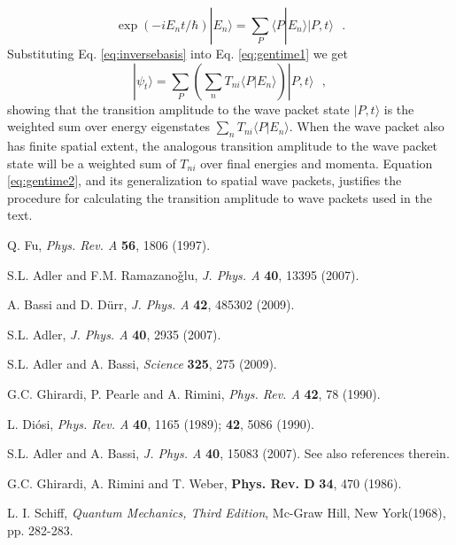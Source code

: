 \documentclass[12pt,onecolumn,amssymb,nofootinbib]{revtex4-2} %
\begin{document}
\begin{equation}\label{eq:inversebasis}
 \exp{(-i E_n t/\hbar)}|E_n \rangle=\sum_P   \langle P| E_n\rangle |P,t\rangle ~~~.
\end{equation}
Substituting Eq. \eqref{eq:inversebasis} into Eq. \eqref{eq:gentime1} we get
\begin{equation}\label{eq:gentime2}
|\psi_t\rangle = \sum_P \left(\sum_n T_{ni} \langle P| E_n\rangle \right)|P,t\rangle ~~~,
\end{equation}
showing that the transition amplitude to the wave packet state $|P,t\rangle $
is the weighted sum over energy eigenstates $\sum_n T_{ni} \langle P| E_n\rangle $.
When the wave packet also has finite spatial extent, the analogous transition amplitude
to the wave packet state will be a weighted sum of $T_{ni}$ over final energies and momenta.
Equation \eqref{eq:gentime2}, and its generalization to spatial wave packets, justifies the procedure for calculating the transition amplitude to wave
packets used in the text.



\begin{thebibliography}{99}

 Q. Fu, {\it Phys. Rev. A} {\bf 56}, 1806 (1997).

 S.L. Adler and F.M. Ramazano\v glu, {\it J. Phys. A} {\bf 40}, 13395 (2007).

 A. Bassi and D. D\"urr, {\it J. Phys. A} {\bf 42}, 485302 (2009).

 S.L. Adler, {\it J. Phys. A} {\bf 40}, 2935 (2007).

 S.L. Adler and A. Bassi, {\it Science} {\bf 325}, 275 (2009).

 G.C. Ghirardi, P. Pearle and A. Rimini, {\it Phys. Rev. A} {\bf 42}, 78 (1990).

 L. Di\'osi, {\it Phys. Rev. A} {\bf 40}, 1165 (1989); {\bf 42}, 5086 (1990).

 S.L. Adler and A. Bassi, {\it J. Phys. A} {\bf 40}, 15083 (2007). See also references therein.

 G.C. Ghirardi, A. Rimini and T. Weber, {\bf Phys. Rev. D} {\bf 34}, 470 (1986).

 L. I. Schiff, {\it Quantum Mechanics, Third Edition}, Mc-Graw Hill, New York(1968),
pp. 282-283.

\end{thebibliography}
\end{document}

